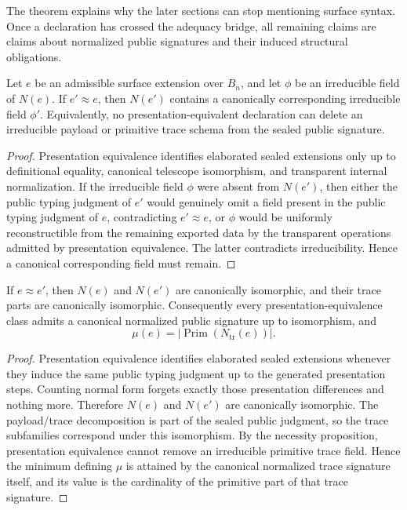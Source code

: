 The theorem explains why the later sections can stop mentioning surface syntax.  Once a
declaration has crossed the adequacy bridge, all remaining claims are claims about normalized
public signatures and their induced structural obligations.

\begin{proposition}
Let \(e\) be an admissible surface extension over \(B_n\), and let \(\phi\) be an irreducible
field of \(N(e)\).  If \(e'\approx e\), then \(N(e')\) contains a canonically corresponding
irreducible field \(\phi'\).  Equivalently, no presentation-equivalent declaration can delete an
irreducible payload or primitive trace schema from the sealed public signature.
\end{proposition}

\begin{proof}
Presentation equivalence identifies elaborated sealed extensions only up to definitional
equality, canonical telescope isomorphism, and transparent internal normalization.  If the
irreducible field \(\phi\) were absent from \(N(e')\), then either the public typing judgment of
\(e'\) would genuinely omit a field present in the public typing judgment of \(e\), contradicting
\(e'\approx e\), or \(\phi\) would be uniformly reconstructible from the remaining exported data
by the transparent operations admitted by presentation equivalence.  The latter contradicts
irreducibility.  Hence a canonical corresponding field must remain.
\end{proof}

\begin{proposition}
If \(e\approx e'\), then \(N(e)\) and \(N(e')\) are canonically isomorphic, and their trace
parts are canonically isomorphic.  Consequently every presentation-equivalence class admits a
canonical normalized public signature up to isomorphism, and
\[
  \mu(e)=\left|\operatorname{Prim}(N_{\mathrm{tr}}(e))\right|.
\]
\end{proposition}

\begin{proof}
Presentation equivalence identifies elaborated sealed extensions whenever they induce the
same public typing judgment up to the generated presentation steps.  Counting normal form
forgets exactly those presentation differences and nothing more.  Therefore \(N(e)\) and
\(N(e')\) are canonically isomorphic.  The payload/trace decomposition is part of the sealed
public judgment, so the trace subfamilies correspond under this isomorphism.  By the
necessity proposition, presentation equivalence cannot remove an irreducible primitive trace
field.  Hence the minimum defining \(\mu\) is attained by the canonical normalized trace
signature itself, and its value is the cardinality of the primitive part of that trace signature.
\end{proof}

